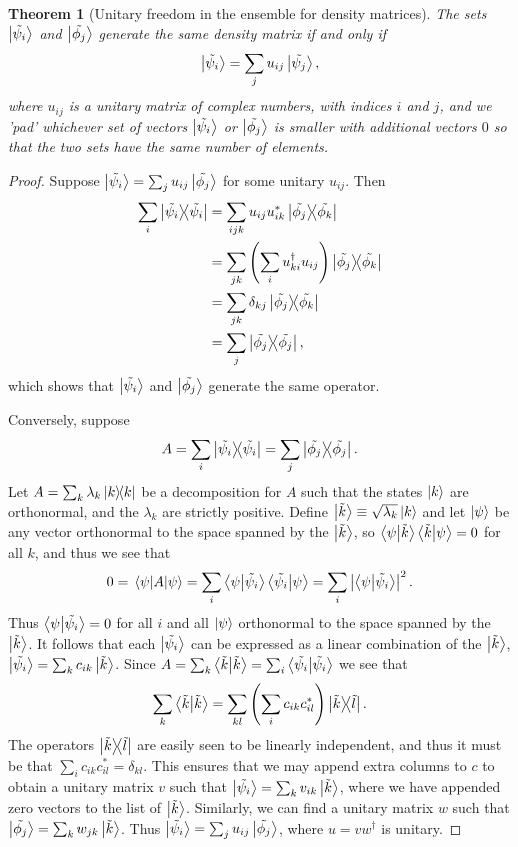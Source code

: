 \documentclass{article}
\newtheorem{theorem}{Theorem}
\numberwithin{theorem}{section}
\numberwithin{corollary}{section}
\numberwithin{postulate}{section}
\begin{document}
\begin{theorem}[Unitary freedom in the ensemble for density matrices]
  The sets $\ket{\tilde{\psi_i}}$ and $\ket{\tilde{\phi_j}}$ generate
  the same density matrix if and only if \[
    \ket{\tilde{\psi_i}} = \sum_j u_{ij}\ket{\tilde{\psi_j}},
  \] where $u_{ij}$ is a unitary matrix of complex numbers, with indices $i$
  and $j$, and we 'pad' whichever set of vectors $\ket{\tilde{\psi_i}}$ or
  $\ket{\tilde{\phi_j}}$ is smaller with additional vectors $0$ so that the
  two sets have the same number of elements.
\end{theorem}
\begin{proof}
  Suppose $\ket{\tilde{\psi_i}} = \sum_j u_{ij}\ket{\tilde{\phi_j}}$ for some
  unitary $u_{ij}$. Then
  \begin{align*}
    \sum_i \op{\tilde{\psi_i}}
    &= \sum_{ijk} u_{ij}u_{ik}^*\op{\tilde{\phi_j}}{\tilde{\phi_k}} \\
    &= \sum_{jk}\left(\sum_i u_{ki}^{\dagger}u_{ij}\right)
      \op{\tilde{\phi_j}}{\tilde{\phi_k}} \\
    &= \sum_{jk} \delta_{kj}\op{\tilde{\phi_j}}{\tilde{\phi_k}} \\
    &= \sum_j \op{\tilde{\phi_j}}{\tilde{\phi_j}},
  \end{align*}
  which shows that $\ket{\tilde{\psi_i}}$ and $\ket{\tilde{\phi_j}}$ generate
  the same operator.

  Conversely, suppose \[
    A = \sum_i \op{\tilde{\psi_i}} = \sum_j \op{\tilde{\phi_j}}.
  \] Let $A = \sum_k \lambda_k\op{k}$ be a decomposition for $A$ such that the
  states $\ket{k}$ are orthonormal, and the $\lambda_k$ are strictly positive.
  Define $\ket{\tilde{k}} \equiv \sqrt{\lambda_k}\ket{k}$ and let $\ket{\psi}$
  be any vector orthonormal to the space spanned by the $\ket{\tilde{k}}$, so
  $\ip{\psi}{\tilde{k}}\ip{\tilde{k}}{\psi} = 0$ for all $k$, and thus we see
  that \[
    0 = \ev{A}{\psi}
    = \sum_i \ip{\psi}{\tilde{\psi_i}}\ip{\tilde{\psi_i}}{\psi}
    = \sum_i \left|\ip{\psi}{\tilde{\psi_i}}\right|^2.
  \] Thus $\ip{\psi}{\tilde{\psi_i}} = 0$ for all $i$ and all $\ket{\psi}$
  orthonormal to the space spanned by the $\ket{\tilde{k}}$. It follows that
  each $\ket{\tilde{\psi_i}}$ can be expressed as a linear combination of the
  $\ket{\tilde{k}}$, $\ket{\tilde{\psi_i}} = \sum_k c_{ik}\ket{\tilde{k}}$.
  Since $A = \sum_k \ip{\tilde{k}} = \sum_i \ip{\tilde{\psi_i}}$ we see that \[
    \sum_k \ip{\tilde{k}}
    = \sum_{kl} \left(\sum_i c_{ik}c_{il}^*\right)\op{\tilde{k}}{\tilde{l}}.
  \] The operators $\op{\tilde{k}}{\tilde{l}}$ are easily seen to be linearly
  independent, and thus it must be that $\sum_i c_{ik}c_{il}^* = \delta_{kl}$.
  This ensures that we may append extra columns to $c$ to obtain a unitary
  matrix $v$ such that $\ket{\tilde{\psi_i}} = \sum_k v_{ik}\ket{\tilde{k}}$,
  where we have appended zero vectors to the list of $\ket{\tilde{k}}$.
  Similarly, we can find a unitary matrix $w$ such that $\ket{\tilde{\phi_j}} =
  \sum_k w_{jk}\ket{\tilde{k}}$. Thus $\ket{\tilde{\psi_i}} = \sum_j
  u_{ij}\ket{\tilde{\phi_j}}$, where $u = vw^{\dagger}$ is unitary.
\end{proof}
\end{document}

